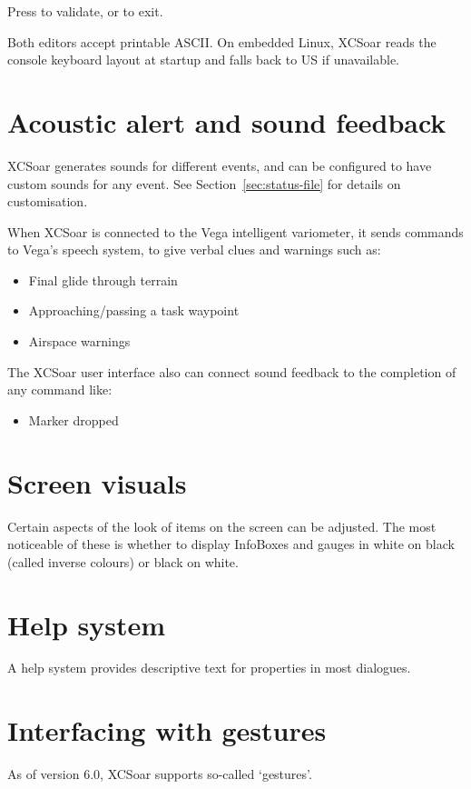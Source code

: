 Press  to validate, or  to exit.

Both editors accept printable ASCII. On embedded Linux, XCSoar reads the
console keyboard layout at startup and falls back to US if unavailable.


\section{Acoustic alert and sound feedback}

XCSoar generates sounds for different events, and can be configured to
have custom sounds for any event.  See Section~\ref{sec:status-file} for
details on customisation.

When XCSoar is connected to the Vega intelligent variometer, it sends
commands to Vega's speech system, to give verbal clues and warnings such as:
\begin{itemize}
\item Final glide through terrain
\item Approaching/passing a task waypoint
\item Airspace warnings
\end{itemize}

The XCSoar user interface also can connect sound feedback to the completion 
of any command like:
\begin{itemize}
\item Marker dropped
\end{itemize}


\section{Screen visuals}

Certain aspects of the look of items on the screen can be adjusted.
The most noticeable of these is whether to display InfoBoxes and
gauges in white on black (called inverse colours) or black on white.


\section{Help system}

A help system provides descriptive text for properties in most
dialogues.

\section{Interfacing with gestures}\label{sec:gestures}
As of version 6.0, XCSoar supports so-called `gestures'.


